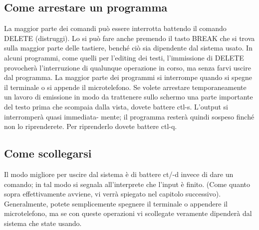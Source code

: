 \subsection{Come arrestare un programma}
La maggior parte dei comandi può essere interrotta battendo il comando DELETE
(distruggi). Lo si può fare anche premendo il tasto BREAK che si trova sulla maggior
parte delle tastiere, benché ciò sia dipendente dal sistema usato. In alcuni programmi,
come quelli per l'editing dei testi, l'immissione di DELETE provocherà l'interruzione
di qualunque operazione in corso, ma senza farvi uscire dal programma.
La maggior parte dei programmi si interrompe quando si spegne il terminale o si
appende il microtelefono. Se volete arrestare temporaneamente un lavoro di emissione
in modo da trattenere sullo schermo una parte importante del testo prima che 
scompaia dalla vista, dovete battere ctl-s. L'output si interromperà quasi immediata-
mente; il programma resterà quindi sospeso finché non lo riprenderete. Per riprenderlo
dovete battere ctl-q.
\subsection{Come scollegarsi}
Il modo migliore per uscire dal sistema è di battere ct/-d invece di dare un comando; in
tal modo si segnala all'interprete che l'input è finito. (Come quanto sopra effettivamente
avviene, vi verrà spiegato nel capitolo successivo). Generalmente, potete semplicemente
spegnere il terminale o appendere il microtelefono, ma se con queste operazioni
vi scollegate veramente dipenderà dal sistema che state usando.
